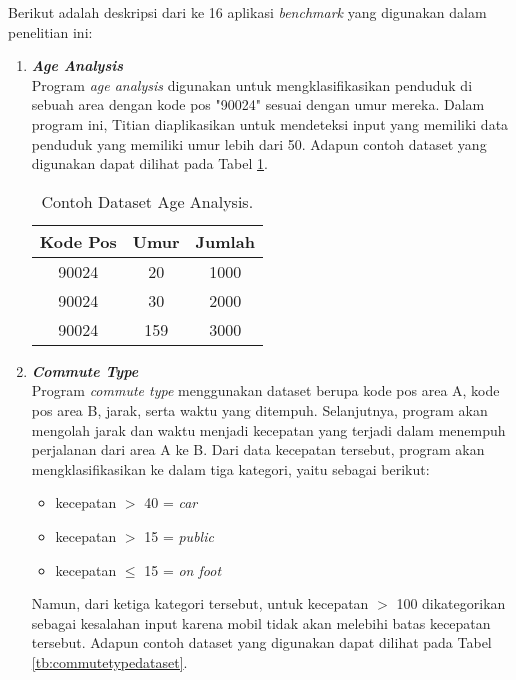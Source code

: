 Berikut adalah deskripsi dari ke 16 aplikasi \emph{benchmark}
yang digunakan dalam penelitian ini:
\begin{enumerate}
      \item \emph{\textbf{Age Analysis}} \\
            Program \emph{age analysis} digunakan untuk mengklasifikasikan penduduk di sebuah area dengan kode pos "90024" sesuai dengan umur mereka. 
            Dalam program ini, Titian diaplikasikan untuk mendeteksi input yang memiliki data penduduk yang memiliki umur lebih dari 50.
            Adapun contoh dataset yang digunakan dapat 
            dilihat pada Tabel \ref{tb:ageanalysisdataset}.

            \begin{longtable}{|c|c|c|}
                  \caption{Contoh Dataset Age Analysis.}
                  \label{tb:ageanalysisdataset} \\
                  \hline
                  \rowcolor[HTML]{C0C0C0}
                  \textbf{Kode Pos} & \textbf{Umur} & \textbf{Jumlah} \\
                  \hline
                  90024 & 20 & 1000 \\
                  90024 & 30 & 2000 \\
                  90024 & 159 & 3000 \\
                  \hline
            \end{longtable}
      
      \item \emph{\textbf{Commute Type}} \\
            Program \emph{commute type} menggunakan dataset berupa kode pos area A, kode pos area B, jarak, serta waktu yang ditempuh. Selanjutnya, program akan mengolah jarak dan waktu menjadi kecepatan yang terjadi dalam menempuh perjalanan dari area A ke B. Dari data kecepatan tersebut, program akan mengklasifikasikan ke dalam tiga kategori, yaitu sebagai berikut:
            \begin{itemize}
                  \item kecepatan $ > $ 40 = \emph{car}
                  \item kecepatan $ > $ 15 = \emph{public}
                  \item kecepatan $ \leq $ 15 = \emph{on foot}
            \end{itemize}
            Namun, dari ketiga kategori tersebut, untuk kecepatan $ > $ 100 dikategorikan sebagai kesalahan input karena mobil tidak akan melebihi batas kecepatan tersebut.
            Adapun contoh dataset yang digunakan dapat 
            dilihat pada Tabel \ref{tb:commutetypedataset}.


\end{enumerate}

